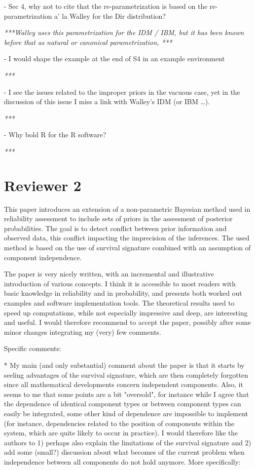 \documentclass[12pt, a4paper]{elsarticle}
\begin{document}
- Sec 4, why not to cite that the re-parametrization is based on the re-parametrization a' la Walley for the Dir distribution?

\medskip
\emph{***Walley uses this parametrization for the IDM / IBM, but it has been known before that as natural or canonical parametrization, ***}
\medskip

- I would shape the example at the end of S4 in an example environment

\medskip
\emph{***}
\medskip

- I see the issues related to the improper priors in the vacuous case, yet in the discussion of this issue I miss a link with Walley's IDM (or IBM \ldots).

\medskip
\emph{***}
\medskip

- Why bold R for the R software?

\medskip
\emph{***}
\medskip


\section*{Reviewer 2}

This paper introduces an extension of a non-parametric Bayesian method used in reliability assessment to include sets of priors in the assessment of posterior probabilities. The goal is to detect conflict between prior information and observed data, this conflict impacting the imprecision of the inferences. The used method is based on the use of survival signature combined with an assumption of component independence.

The paper is very nicely written, with an incremental and illustrative introduction of various concepts. I think it is accessible to most readers with basic knowledge in reliability and in probability, and presents both worked out examples and software implementation tools. The theoretical results used to speed up computations, while not especially impressive and deep, are interesting and useful. I would therefore recommend to accept the paper, possibly after some minor changes integrating my (very) few comments.

Specific comments:

* My main (and only substantial) comment about the paper is that it starts by seeling advantages of the survival signature, which are then completely forgotten since all mathematical developments concern independent components. Also, it seems to me that some points are a bit "oversold", for instance while I agree that the dependence of identical component types or between component types can easily be integrated, some other kind of dependence are impossible to implement (for instance, dependencies related to the position of components within the system, which are quite likely to occur in practice). I would therefore like the authors to 1) perhaps also explain the limitations of the survival signature and 2) add some (small?) discussion about what becomes of the current problem when independence between all components do not hold anymore. More specifically:
\end{document}

